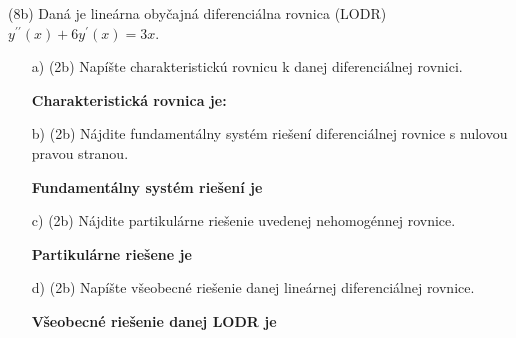 \pr (8b) Daná je lineárna obyčajná diferenciálna rovnica (LODR)
$y^{\prime\prime}(x) +6y^{\prime}(x)= 3x$.

\begin{enumerate}
\item[a)](2b) Napíšte charakteristickú rovnicu k danej diferenciálnej rovnici.
\medskip

\textbf{Charakteristická rovnica je:} \gr

\item[b)] (2b) Nájdite fundamentálny systém riešení diferenciálnej rovnice s nulovou pravou stranou.

\medskip

\textbf{Fundamentálny systém riešení je} \gr

\item[c)] (2b) Nájdite partikulárne riešenie uvedenej nehomogénnej rovnice.

\medskip

\textbf{Partikulárne riešene je} \gr

\item[d)] (2b) Napíšte všeobecné riešenie danej lineárnej diferenciálnej rovnice.

\medskip

\textbf{Všeobecné riešenie danej LODR je} \gr
\end{enumerate}
